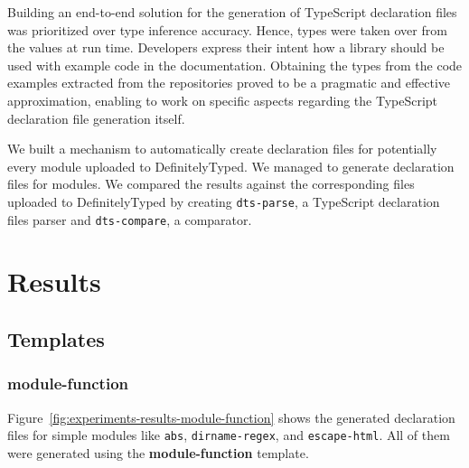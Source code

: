 \documentclass[sigplan,screen]{acmart}
\newcommand{\figref}[1]{Figure~\ref{#1}}
\begin{document}
Building an end-to-end solution for the generation of TypeScript declaration files was
prioritized over type inference accuracy. Hence, types were taken over from the
values at run time. Developers express their intent how a library should be used with
example code in the documentation. 
Obtaining the types from the code examples extracted from the repositories proved to be a
pragmatic and effective approximation, enabling to work on specific aspects regarding the
TypeScript declaration file generation itself.

We built a mechanism to automatically create declaration files for potentially every
module uploaded to DefinitelyTyped. We managed to generate declaration files for
\CountModulesGeneratedDeclarationFile{} modules. We compared the results against the corresponding 
files uploaded to
DefinitelyTyped by creating \texttt{dts-parse}, a TypeScript declaration files parser and
\texttt{dts-compare}, a comparator.



\clearpage
\appendix
\section{Results}
\subsection{Templates}
\label{sec:appendix-results-templates}
\subsubsection{module-function}
\figref{fig:experiments-results-module-function} shows the generated
declaration files for simple modules like \texttt{abs},
\texttt{dirname-regex}, and \texttt{escape-html}. All of them were
generated using the \textbf{module-function} template. 
\end{document}
